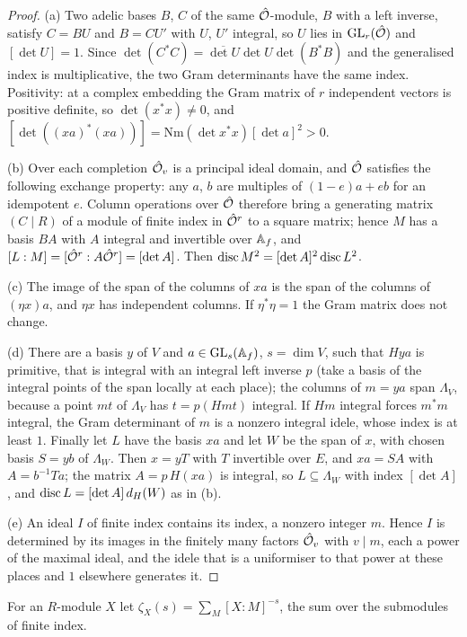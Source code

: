 \begin{proof}
(a) Two adelic bases $B$, $C$ of the same $\hat{\mathcal{O}}$-module, $B$ with a left inverse, satisfy $C=BU$ and $B=CU'$ with $U$, $U'$ integral, so $U$ lies in $\operatorname{GL}_r(\hat{\mathcal{O}})$ and $[\det U]=1$. Since
$\det(C^*C)=\overline{\det U}\det U\det(B^*B)$ and the generalised index is multiplicative, the two Gram determinants have the same index. Positivity: at a complex embedding the Gram matrix of $r$
independent vectors is positive definite, so $\det(x^*x)\ne0$, and $[\det((xa)^*(xa))]=\mathrm{Nm}(\det x^*x)[\det a]^2>0$.

(b) Over each completion $\hat{\mathcal{O}}_v$ is a principal ideal domain, and $\hat{\mathcal{O}}$ satisfies the following exchange property: any $a$, $b$ are multiples of $(1-e)a+eb$ for an idempotent $e$. Column operations over $\hat{\mathcal{O}}$
therefore bring a generating matrix $(C\mid R)$ of a module of finite index in $\hat{\mathcal{O}}^r$ to a square matrix; hence $M$ has a basis $BA$ with $A$ integral and invertible over $\mathbb{A}_f$, and
$[L:M]=[\hat{\mathcal{O}}^r:A\hat{\mathcal{O}}^r]=[\det A]$. Then $\operatorname{disc} M^2=[\det A]^2\operatorname{disc} L^2$.

(c) The image of the span of the columns of $xa$ is the span of the columns of $(\eta x)a$, and $\eta x$ has independent columns. If $\eta^*\eta=1$ the Gram matrix does not change.

(d) There are a basis $y$ of $V$ and $a\in\operatorname{GL}_s(\mathbb{A}_f)$, $s=\dim V$, such that $Hya$ is primitive, that is integral with an integral left inverse $p$ (take a basis of the integral points of the span locally at each
place); the columns of $m=ya$ span $\Lambda_V$, because a point $mt$ of $\Lambda_V$ has $t=p(Hmt)$ integral. If $Hm$ integral forces $m^*m$ integral, the Gram determinant of $m$ is a nonzero integral idele, whose
index is at least $1$. Finally let $L$ have the basis $xa$ and let $W$ be the span of $x$, with chosen basis $S=yb$ of $\Lambda_W$. Then $x=yT$ with $T$ invertible over $E$, and $xa=SA$ with $A=b^{-1}Ta$; the
matrix $A=p\,H(xa)$ is integral, so $L\subseteq\Lambda_W$ with index $[\det A]$, and $\operatorname{disc} L=[\det A]\,d_H(W)$ as in (b).

(e) An ideal $I$ of finite index contains its index, a nonzero integer $m$. Hence $I$ is determined by its images in the finitely many factors $\hat{\mathcal{O}}_v$ with $v\mid m$, each a power of the maximal ideal,
and the idele that is a uniformiser to that power at these places and $1$ elsewhere generates it.
\end{proof}

For an $R$-module $X$ let $\zeta_X(s)=\sum_M[X:M]^{-s}$, the sum over the submodules of finite index.

